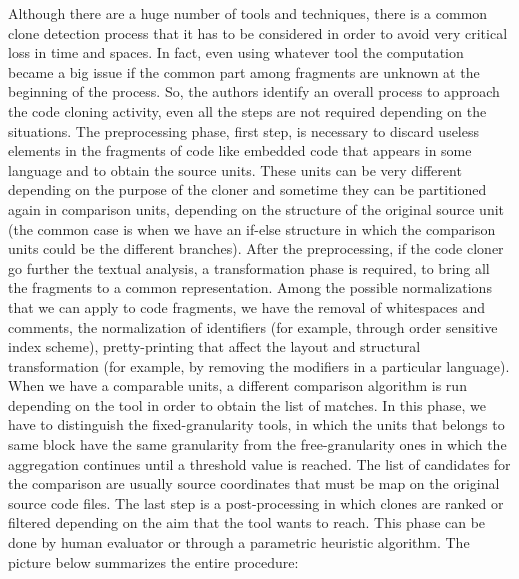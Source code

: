 Although there are a huge number of tools and techniques, there is a common clone detection process that it has to be considered in order to avoid very critical loss in time and spaces. In fact, even using whatever tool the computation became a big issue if the common part among fragments are unknown at the beginning of the process. So, the authors identify an overall process to approach the code cloning activity, even all the steps are not required depending on the situations. The preprocessing phase, first step, is necessary to discard useless elements in the fragments of code like embedded code that appears in some language and to obtain the source units. These units can be very different depending on the purpose of the cloner and sometime they can be partitioned again in comparison units, depending on the structure of the original source unit (the common case is when we have an if-else structure in which the comparison units could be the different branches). After the preprocessing, if the code cloner go further the textual analysis, a transformation phase is required, to bring all the fragments to a common representation. Among the possible normalizations that we can apply to code fragments, we have the removal of whitespaces and comments, the normalization of identifiers (for example, through order sensitive index scheme), pretty-printing that affect the layout and structural transformation (for example, by removing the modifiers in a particular language). When we have a comparable units, a different comparison algorithm is run depending on the tool in order to obtain the list of matches. In this phase, we have to distinguish the fixed-granularity tools, in which the units that belongs to same block have the same granularity from the free-granularity ones in which the aggregation continues until a threshold value is reached. The list of candidates for the comparison are usually source coordinates that must be map on the original source code files. The last step is a post-processing in which clones are ranked or filtered depending on the aim that the tool wants to reach. This phase can be done by human evaluator or through a parametric heuristic algorithm. The picture below summarizes the entire procedure:\\

